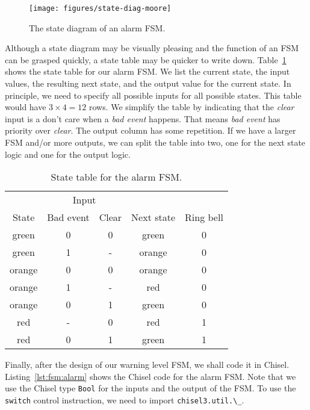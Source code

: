 \documentclass[%
    10pt,
    headinclude, footexclude,
    openright, %
    notitlepage,
    cleardoubleempty,
    headsepline,
    pointlessnumbers,
    bibtotoc, idxtotoc,
    ]{scrbook}
\newcommand{\scale}{0.7}
\newcommand{\code}[1]{{\lstinline[basicstyle=\small\ttfamily]{#1}}}
\begin{document}
\begin{figure}
  \centering
  \texttt{[image: figures/state-diag-moore]}
  \caption{The state diagram of an alarm FSM.}
  \label{fig:diag-moore}
\end{figure}

Although a state diagram may be visually pleasing and the function of an FSM
can be grasped quickly, a state table may be quicker to write down.
Table~\ref{tab:state:table} shows the state table for our alarm FSM.
We list the current state, the input values, the resulting next state, and
the output value for the current state. In principle, we need to
specify all possible inputs for all possible states. This table would have
$3 \times 4 = 12$ rows. We simplify the table by indicating that the \emph{clear}
input is a don't care when a \emph{bad event} happens. That means
\emph{bad event} has priority over \emph{clear}. The output column
has some repetition. If we have a larger FSM and/or more outputs, we
can split the table into two, one for the next state logic and one for the
output logic.

\begin{table}
\centering
\caption{State table for the alarm FSM.}
\begin{tabular}{ccccc}
\toprule
& \multicolumn{2}{c}{Input} \\
\cmidrule{2-3}
State &  Bad event & Clear & Next state & Ring bell \\
\midrule
green & 0 & 0 & green & 0 \\
green & 1 & - & orange & 0 \\
orange & 0 & 0 & orange & 0 \\
orange & 1 & - & red & 0 \\
orange & 0 & 1 & green & 0 \\
red & - & 0 & red & 1 \\
red & 0 & 1 & green & 1 \\
\bottomrule
\end{tabular}
\label{tab:state:table}
\end{table}

Finally, after the design of our warning level FSM, we shall code it in Chisel.
Listing~\ref{lst:fsm:alarm} shows the Chisel code for the alarm FSM.
Note that we use the Chisel type \code{Bool} for the inputs and the
output of the FSM.
To use the \code{switch} control instruction, we need to
import \code{chisel3.util.\_}.

\end{document}
